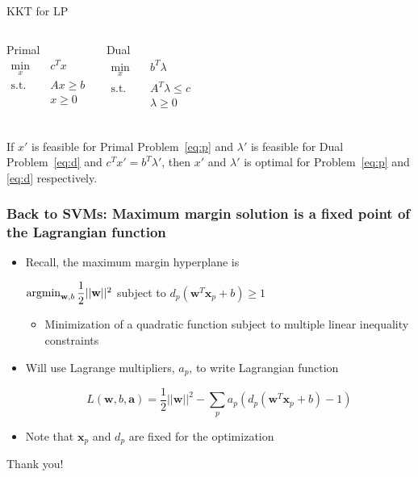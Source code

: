 \documentclass[12pt,notes,mathserif]{beamer}
\newcommand{\chuhao}{\fontsize{44.9pt}{\baselineskip}\selectfont}
\begin{document}
\begin{frame}
	{KKT for LP} 
	\begin{columns}
		\begin{block}{Primal}
			\begin{equation} \label{eq:p}
				\begin{aligned}
					\min_x \quad & c^T x \\
					\textrm{s.t.} \quad & Ax \ge b \\
					& x \ge 0 \\ 
				\end{aligned}
			\end{equation}
		\end{block}
		\begin{block}{Dual}
			\begin{equation} \label{eq:d}
				\begin{aligned}
					\min_x \quad & b^T \lambda \\
					\textrm{s.t.} \quad & A^T \lambda \le c \\
					& \lambda \ge 0 \\ 
				\end{aligned}
			\end{equation}
		\end{block}
	\end{columns}
	\begin{theorem}
		If $x'$ is feasible for Primal Problem~\ref{eq:p} and $\lambda'$ is feasible for Dual Problem~\ref{eq:d} and $c^Tx' = b^T \lambda'$, then $x'$ and $\lambda'$ is optimal for   Problem~\ref{eq:p} and \ref{eq:d} respectively. 	
	\end{theorem}
\end{frame}

\begin{frame}[c]
	\frametitle{Back to SVMs: Maximum margin solution is a fixed point of the Lagrangian function}
	\begin{itemize}
		\item Recall, the maximum margin hyperplane is

		      $\mathop{\mathrm{argmin}}_{\mathbf{w},b} \dfrac{1}{2}||\mathbf{w}||^2$ subject to $d_p(\mathbf{w}^T \mathbf{x}_p+b)\geqslant{}1$
		      \begin{itemize}
			      \item Minimization of a quadratic function subject to multiple linear inequality constraints
		      \end{itemize}
		\item Will use Lagrange multipliers, $a_p$, to write Lagrangian function

		      $$L(\mathbf{w},b,\mathbf{a})=\dfrac{1}{2}||\mathbf{w}||^2-\sum_{p}a_p(d_p( \mathbf{w} ^T\mathbf{x}_p+b)-1)$$

		\item Note that $\mathbf{x}_p$ and $d_p$ are fixed for the optimization
	\end{itemize}
\end{frame}




\begin{frame}
	\begin{center}
		\chuhao Thank you! %
	\end{center}
\end{frame}
\end{document}

